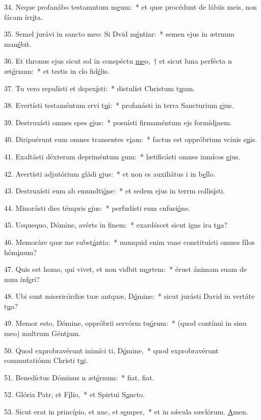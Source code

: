 34. Neque profanábo testamntum m\uline{e}um:~* et quæ procédunt de lábiis meis, non fácam írr\uline{i}ta.\par 
35. Semel jurávi in sancto meo: Si Dvid m\uline{é}ntiar:~* semen ejus in ætrnum man\uline{é}bit.\par 
36. Et thronus ejus sicut sol in conspéctu \uline{me}o,~† et sicut luna perfécta n æt\uline{é}rnum:~* et testis in clo fid\uline{é}lis.\par 
37. Tu vero repulísti et dspex\uline{í}sti:~* distulíst Christum t\uline{u}um.\par 
38. Evertísti testaméntum srvi t\uline{u}i:~* profanásti in terra Sancturium \uline{e}jus.\par 
39. Destruxísti omnes spes \uline{e}jus:~* posuísti firmaméntum ejs formíd\uline{i}nem.\par 
40. Diripuérunt eum omnes transentes v\uline{i}am:~* factus est oppróbrium vcínis s\uline{u}is.\par 
41. Exaltásti déxteram depriméntum \uline{e}um:~* lætificásti omnes inmícos \uline{e}jus.\par 
42. Avertísti adjutórium gládi \uline{e}jus:~* et non es auxiliátus i in b\uline{e}llo.\par 
43. Destruxísti eum ab emundti\uline{ó}ne:~* et sedem ejus in terrm collis\uline{í}sti.\par 
44. Minorásti dies témpris \uline{e}jus:~* perfudísti eum cnfusi\uline{ó}ne.\par 
45. Usquequo, Dómine, avérts in f\uline{i}nem:~* exardéscet sicut igns ira t\uline{u}a?\par 
46. Memoráre quæ me subst\uline{á}ntia:~* numquid enim vane constituísti omnes fílos hóm\uline{i}num?\par 
47. Quis est homo, qui vivet, et non vidbit m\uline{o}rtem:~* éruet ánimam suam de mnu ínf\uline{e}ri?\par 
48. Ubi sunt misericórdiæ tuæ antquæ, D\uline{ó}mine:~* sicut jurásti David in vertáte t\uline{u}a?\par 
49. Memor esto, Dómine, oppróbrii servórm tu\uline{ó}rum:~* (quod contínui in sinu meo) multrum Gént\uline{i}um.\par 
50. Quod exprobravérunt inimíci ti, D\uline{ó}mine,~* quod exprobravérunt commutatiónm Christi t\uline{u}i.\par 
51. Benedíctus Dóminus n æt\uline{é}rnum:~* fiat, f\uline{i}at.\par 
52. Glória Patr, et F\uline{í}lio,~* et Spirtui S\uline{a}ncto.\par 
53. Sicut erat in princípio, et nnc, et s\uline{e}mper,~* et in sǽcula sæclórum. \uline{A}men.\par 
